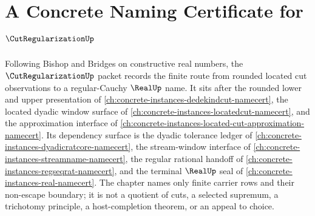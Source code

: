 \chapter{A Concrete Naming Certificate for $\CutRegularizationUp$}
\label{ch:concrete-instances-cut-regularization-namecert}

Following Bishop and Bridges on constructive real numbers, the $\CutRegularizationUp$ packet records the finite route from rounded located cut observations to a regular-Cauchy $\RealUp$ name. It sits after the rounded lower and upper presentation of \autoref{ch:concrete-instances-dedekindcut-namecert}, the located dyadic window surface of \autoref{ch:concrete-instances-locatedcut-namecert}, and the approximation interface of \autoref{ch:concrete-instances-located-cut-approximation-namecert}. Its dependency surface is the dyadic tolerance ledger of \autoref{ch:concrete-instances-dyadicratcore-namecert}, the stream-window interface of \autoref{ch:concrete-instances-streamname-namecert}, the regular rational handoff of \autoref{ch:concrete-instances-regseqrat-namecert}, and the terminal $\RealUp$ seal of \autoref{ch:concrete-instances-real-namecert}. The chapter names only finite carrier rows and their non-escape boundary; it is not a quotient of cuts, a selected supremum, a trichotomy principle, a host-completion theorem, or an appeal to choice.

